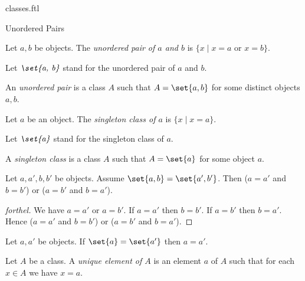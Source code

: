 \documentclass{naproche-library}
\begin{document}
\begin{smodule}[title=Classes]{classes.ftl}
\begin{sfragment}{Unordered Pairs}
  \begin{definition}[forthel,id=FOUNDATIONS_01_3471035364016128]
    Let $a, b$ be objects.
    The \emph{unordered pair of $a$ and $b$} is $\{ x \mid x = a$ or $x = b \}$.

    Let $\emph{\set{a, b}}$ stand for the unordered pair of $a$ and $b$.
  \end{definition}

  \begin{definition}[forthel,id=FOUNDATIONS_01_605432672419840]
    An \emph{unordered pair} is a class $A$ such that $A = \set{a, b}$ for some distinct objects $a, b$.
  \end{definition}

  \begin{definition}[forthel,id=FOUNDATIONS_01_1160414603771904]
    Let $a$ be an object.
    The \emph{singleton class of $a$} is $\{ x \mid x = a \}$.

    Let $\emph{\set{a}}$ stand for the singleton class of $a$.
  \end{definition}

  \begin{definition}[forthel,id=FOUNDATIONS_01_6786618161627136]
    A \emph{singleton class} is a class $A$ such that $A = \set{a}$ for some object $a$.
  \end{definition}

  \begin{proposition}[forthel,id=FOUNDATIONS_01_6125259604361216]
    Let $a, a', b, b'$ be objects.
    Assume $\set{a, b} = \set{a', b'}$.
    Then ($a = a'$ and $b = b'$) or ($a = b'$ and $b = a'$).
  \end{proposition}
  \begin{proof}[forthel]
    We have $a = a'$ or $a = b'$.
    If $a = a'$ then $b = b'$.
    If $a = b'$ then $b = a'$.
    Hence ($a = a'$ and $b = b'$) or ($a = b'$ and $b = a'$).
  \end{proof}

  \begin{corollary}[forthel,id=FOUNDATIONS_01_6954678910713856]
    Let $a, a'$ be objects.
    If $\set{a} = \set{a'}$ then $a = a'$.
  \end{corollary}

  \begin{definition}[forthel,id=FOUNDATIONS_01_29867480293464351]
    Let $A$ be a class.
    A \emph{unique element of $A$} is an element $a$ of $A$ such that for each $x \in A$ we have $x = a$.
  \end{definition}


\end{sfragment}
\end{smodule}
\end{document}
